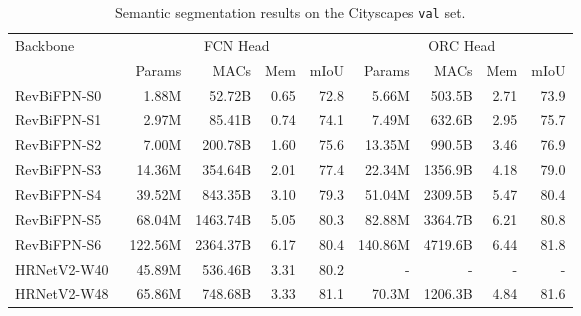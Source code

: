 \documentclass{article}
\begin{document}
\begin{table*}
    \caption{
        Semantic segmentation results on the Cityscapes \texttt{val} set.
    }
    \vskip 10pt
    \centering
    \small
    \sc
    \begin{tabular}{l|rrrr|rrrr}
        \toprule
        \multirow{2}{*}{Backbone}        &  \multicolumn{4}{c|}{FCN Head}    & \multicolumn{4}{c}{ORC Head}    \\ &  Params &     MACs &  Mem & mIoU &  Params &    MACs &  Mem & mIoU \\ \midrule
        RevBiFPN-S0                      &   1.88M &   52.72B & 0.65 & 72.8 &   5.66M &  503.5B & 2.71 & 73.9 \\
        RevBiFPN-S1                      &   2.97M &   85.41B & 0.74 & 74.1 &   7.49M &  632.6B & 2.95 & 75.7 \\
        RevBiFPN-S2                      &   7.00M &  200.78B & 1.60 & 75.6 &  13.35M &  990.5B & 3.46 & 76.9 \\
        RevBiFPN-S3                      &  14.36M &  354.64B & 2.01 & 77.4 &  22.34M & 1356.9B & 4.18 & 79.0 \\ 
        RevBiFPN-S4                      &  39.52M &  843.35B & 3.10 & 79.3 &  51.04M & 2309.5B & 5.47 & 80.4 \\ 
        RevBiFPN-S5                      &  68.04M & 1463.74B & 5.05 & 80.3 &  82.88M & 3364.7B & 6.21 & 80.8 \\
        RevBiFPN-S6                      & 122.56M & 2364.37B & 6.17 & 80.4 & 140.86M & 4719.6B & 6.44 & 81.8 \\ \midrule
        HRNetV2-W40~\cite{wang2020hrnet} &  45.89M &  536.46B & 3.31 & 80.2 &       - &       - &    - &    - \\
        HRNetV2-W48~\cite{wang2020hrnet} &  65.86M &  748.68B & 3.33 & 81.1 &   70.3M & 1206.3B & 4.84 & 81.6 \\
        \bottomrule
    \end{tabular}
\label{tab:cityscapes}
\end{table*}
\end{document}

